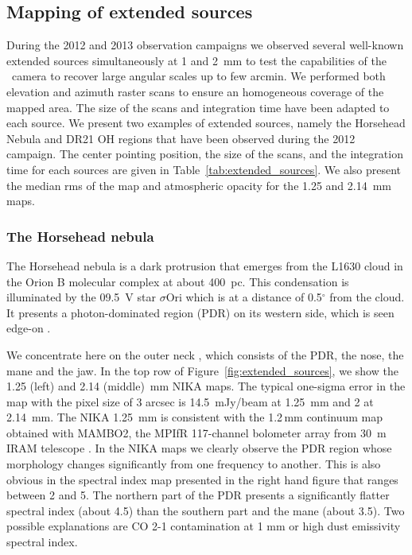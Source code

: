 \subsection{Mapping of extended sources}   
\label{ES}

During the 2012 and 2013 observation campaigns we observed several well-known extended sources simultaneously at 1 and 2~mm to test the capabilities of
the \NIKA\ camera to recover large angular scales up to few arcmin. We performed
both elevation and azimuth raster scans to ensure an homogeneous coverage of
the mapped area. The size of the scans and integration time have been adapted
to each source. We present two examples of extended sources, namely the
Horsehead Nebula and DR21 OH regions that have been observed
during the 2012 campaign. The center pointing position, the size of the scans,
and the integration time for each sources are given in
Table~\ref{tab:extended_sources}. We also present the median rms of the map
and atmospheric opacity for the 1.25 and 2.14~mm maps.
 
 
\subsubsection*{The Horsehead nebula}
The Horsehead nebula is a dark protrusion that emerges from the L1630 cloud in the Orion B molecular complex at about 400~pc. This condensation is illuminated by the 09.5~V star $\sigma$Ori which is at a distance of 0.5$^{\circ}$ from the cloud. It presents a photon-dominated region (PDR) on its western side, which is seen edge-on  \citep{2003A&A...410..577A}. 

We concentrate here on the outer neck \citep{2005A&A...440..909H}, which
consists of the PDR, the nose, the mane and the jaw. In the top row of
Figure~\ref{fig:extended_sources}, we show the 1.25 (left) and 2.14 (middle)~mm
NIKA maps. The typical one-sigma error in the map with the pixel size of 3 arcsec is 14.5~mJy/beam at 1.25~mm and 2 at 2.14~mm.  The NIKA 1.25~mm is consistent with the
1.2\,mm continuum map \citep{2005A&A...440..909H} obtained with MAMBO2, the
MPIfR 117-channel bolometer array from 30~m IRAM telescope \citep{1992ESASP.356..207K}. In the NIKA maps we clearly
observe the PDR region whose morphology changes significantly
from one frequency to another. This is also obvious in the spectral index map
presented in the right hand figure that ranges between 2 and 5. The northern part of the PDR presents a
significantly flatter spectral index (about 4.5) than the southern part and
the mane (about 3.5). Two possible explanations are CO 2-1 contamination at 1
mm or high dust emissivity spectral index\citep{2013ApJ}. 

